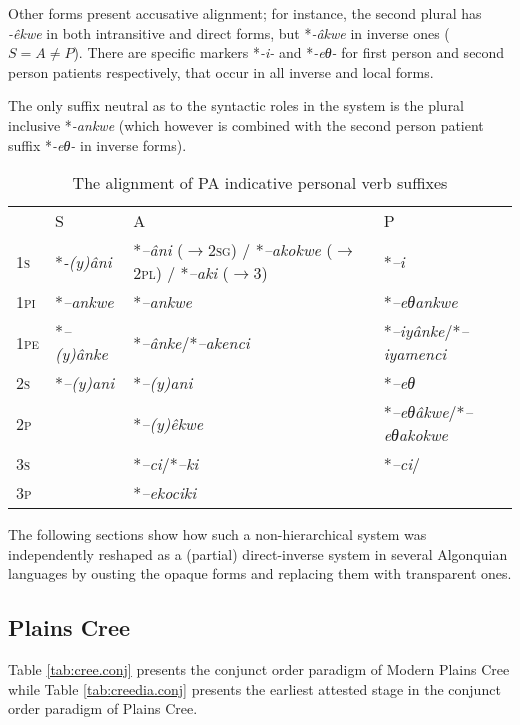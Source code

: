 \documentclass[twoside,a4paper,11pt]{article}
\newcommand{\ipa}[1]{{\phon\textit{#1}}}
\newcommand{\Σ}{\greek{Σ}}
\begin{document}
Other forms present accusative alignment; for instance, the second plural has \ipa{-êkwe} in both intransitive and direct forms, but *\ipa{-âkwe}  in inverse ones ($S = A \ne P$). There are specific markers *\ipa{-i-} and *\ipa{-eθ-} for first person and second person patients respectively, that occur in all inverse and local forms.

The only suffix neutral as to the syntactic roles in the system is the plural inclusive *\ipa{-ankwe} (which however is combined with 
the second person patient suffix *\ipa{-eθ-} in inverse forms).


\begin{table}[H]
\caption{The alignment of PA indicative personal verb suffixes}
\centering \label{tab:protoalg.align}
\begin{tabular}{llll}
\toprule
& S & A & P\\
\textsc{1s} & *\ipa{-(y)âni} & *\ipa{--âni} ($\rightarrow$\textsc{2sg}) / *\ipa{--akokwe} ($\rightarrow$\textsc{2pl}) / *\ipa{--aki} ($\rightarrow$3)& *\ipa{--i}\\
\textsc{1pi} & *\ipa{--ankwe} & *\ipa{--ankwe} & *\ipa{--eθankwe}\\
\textsc{1pe} & *\ipa{--(y)ânke} & *\ipa{--ânke}/*\ipa{--akenci} & *\ipa{--iyânke}/*\ipa{--iyamenci}\\
\midrule
\textsc{2s} & *\ipa{--(y)ani} & *\ipa{--(y)ani} & *\ipa{--eθ}\\
\textsc{2p} & 	& *\ipa{--(y)êkwe} & *\ipa{--eθâkwe}/*\ipa{--eθakokwe}\\
\midrule
\textsc{3s} & 	 & 	*\ipa{--ci}/*\ipa{--ki} & *\ipa{--ci}/\\
\textsc{3p} & 	 & 	*\ipa{--ekociki} & \\
\bottomrule
\end{tabular}
\end{table}


The following sections show how such a non-hierarchical system was independently reshaped as a (partial) direct-inverse system in several Algonquian languages by ousting the opaque forms and replacing them with transparent ones. 
 
 

\subsection{Plains Cree}
Table \vref{tab:cree.conj} presents the conjunct order paradigm of Modern Plains Cree while Table \vref{tab:creedia.conj} presents the earliest attested stage in the conjunct order paradigm of Plains Cree.
\end{document}
